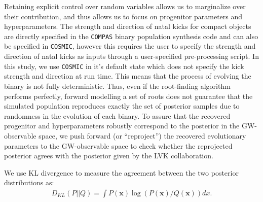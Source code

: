 \documentclass[linenumbers,twocolumn]{aastex631}
\newcommand{\wf}[1]{\textcolor{cyan}{WF: #1}}
\begin{document}
Retaining explicit control over random variables allows us to marginalize over
their contribution, and thus allows us to focus on progenitor parameters and
hyperparameters. The strength and direction of natal kicks for compact objects 
are directly specified in the \texttt{COMPAS} binary population synthesis code 
\citep{Riley2022} and can also be specified in \texttt{COSMIC}, however 
this requires the user to specify the strength and direction of natal kicks as 
inputs through a user-specified pre-processing script.  In this study, we use 
\texttt{COSMIC} in it's default state which does not specify the kick strength 
and direction at run time. %
This means that the process of evolving the binary
is not fully deterministic. Thus, even if the root-finding algorithm performs
perfectly, forward modelling a set of roots does not guarantee that the
simulated population reproduces exactly the set of posterior samples due to
randomness in the evolution of each binary. To assure that the recovered
progenitor and hyperparameters robustly correspond to the posterior in the
GW-observable space, we push forward (or ``reproject'') the recovered
evolutionary parameters to the GW-observable space to check whether the
reprojected posterior agrees with the posterior given by the LVK collaboration.




We use KL divergence to measure the agreement between the two posterior
distributions as:
\begin{align}
D_{KL}(P||Q) = \int P(\bm{x}) \log(P(\bm{x})/Q(\bm{x})) dx.
\label{eq:KLdivergence}
\end{align}
\end{document}
